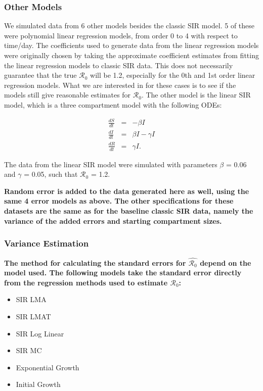 \documentclass[12pt]{article}
\newcommand{\rr}{\ensuremath{\mathcal{R}_0}}
\begin{document}
\subsubsection{Other Models}
We simulated data from 6 other models besides the classic SIR model. 5 of these were polynomial linear regression models, from order 0 to 4 with respect to time/day. The coefficients used to generate data from the linear regression models were originally chosen by taking the approximate coefficient estimates from fitting the linear regression models to classic SIR data. This does not necessarily guarantee that the true $\rr$ will be 1.2, especially for the 0th and 1st order linear regression models. What we are interested in for these cases is to see if the models still give reasonable estimates for $\rr$. The other model is the linear SIR model, which is a three compartment model with the following ODEs:

	\begin{eqnarray*}
		\frac{dS}{dt} &=& -\beta I \\
		\frac{dI}{dt} &=& \beta I - \gamma I \\
		\frac{dR}{dt} &=& \gamma I.
	\end{eqnarray*}

 The data from the linear SIR model were simulated with parameters $\beta$ = 0.06 and $\gamma$ = 0.05, such that $\rr$ = 1.2. 
 
 \textbf{Random error is added to the data generated here as well, using the same 4 error models as above. The other specifications for these datasets are the same as for the baseline classic SIR data, namely the variance of the added errors and starting compartment sizes.}

\subsubsection{Variance Estimation}

\textbf{The method for calculating the standard errors for $\hat{\rr}$ depend on the model used. The following models take the standard error directly from the regression methods used to estimate $\rr$:}

	\begin{itemize}
		\item SIR LMA
		\item SIR LMAT
		\item SIR Log Linear
		\item SIR MC
		\item Exponential Growth
		\item Initial Growth
	\end{itemize}
\end{document}

